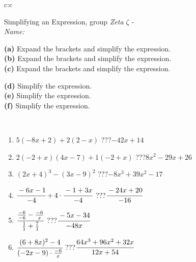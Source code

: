 \documentclass[10pt]{report}
\begin{document}
\newpage
\thispagestyle{empty}
\begin{tabular}{c:c}
\begin{minipage}[c][104.5mm][t]{0.5\linewidth}
\begin{center}
\vspace{7mm}
{\huge Simplifying an Expression, group \textit{Zeta $\zeta$} -}\\[5mm]
\textit{Name:}\phantom{xxxxxxxxxxxxxxxxxxxxxxxxxxxxxxxxxxxxxxxxxxxxxxxxxxxxxxxxxxxxxxxxx}\\[5mm]
\begin{minipage}{0.95\linewidth}
\begin{center}
{\small \begin{minipage}{0.6\textwidth}
\textbf{(a)} Expand the brackets and simplify the expression. \\[1mm]
\textbf{(b)} Expand the brackets and simplify the expression. \\[1mm]
\textbf{(c)} Expand the brackets and simplify the expression.
\end{minipage} \begin{minipage}{0.39\textwidth}
\textbf{(d)} Simplify the expression. \\[1mm]
\textbf{(e)} Simplify the expression. \\[1mm]
\textbf{(f)} Simplify the expression.
\end{minipage}
}
\end{center}
\end{minipage}
\\[4mm]
\begin{minipage}{0.79\linewidth}
\begin{center}
\begin{varwidth}{\linewidth}
\begin{enumerate}
\normalsize
\item $5(-8x+2)+2(2-x)$\quad \dotfill\; ???\;\dotfill \quad $-42x+14$
\item $2(-2+x)(4x-7)+1(-2+x)$\quad \dotfill\; ???\;\dotfill \quad $8x^2-29x+26$
\item $(2x+4)^3-(3x-9)^2$\quad \dotfill\; ???\;\dotfill \quad $-8x^3+39x^2-17$
\item $\cfrac{-6x-1}{-4}+4\cdot\cfrac{-1+3x}{-4}$\quad \dotfill\; ???\;\dotfill \quad $\cfrac{-24x+20}{-16}$
\item $\cfrac{\frac{-6}{-6}-\frac{-6}{x}}{\frac{1}{1}+\frac{7}{1}}$\quad \dotfill\; ???\;\dotfill \quad $\cfrac{-5x-34}{-48x}$
\item $\cfrac{(6+8x)^2-4}{(-2x-9)\cdot\frac{-6}{x}}$\quad \dotfill\; ???\;\dotfill \quad $\cfrac{64x^3+96x^2+32x}{12x+54}$

\end{enumerate}
\end{varwidth}
\end{center}
\end{minipage}
\end{center}
\end{minipage}
\end{tabular}
\end{document}
